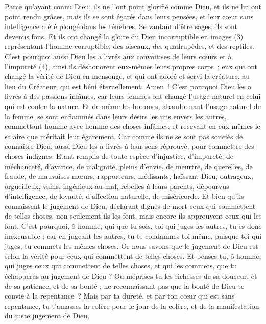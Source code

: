 \begin{multicols}{2}
Parce qu'ayant connu Dieu, ils ne l'ont point glorifié comme Dieu, et ils ne lui ont point rendu grâces, mais ils se sont égarés dans leurs pensées, et leur cœur sans intelligence a été plongé dans les ténèbres.
Se vantant d’être sages, ils sont devenus fous.
Et ils ont changé la gloire du Dieu incorruptible en images (3) représentant l'homme corruptible, des oiseaux, des quadrupèdes, et des reptiles.
C'est pourquoi aussi Dieu les a livrés aux convoitises de leurs cœurs et à l’impureté (4), ainsi ils déshonorent eux-mêmes leurs propres corps ;
eux qui ont changé la vérité de Dieu en mensonge, et qui ont adoré et servi la créature, au lieu du Créateur, qui est béni éternellement. Amen !
C'est pourquoi Dieu les a livrés à des passions infâmes, car leurs femmes ont changé l'usage naturel en celui qui est contre la nature.
Et de même les hommes, abandonnant l'usage naturel de la femme, se sont enflammés dans leurs désirs les uns envers les autres, commettant homme avec homme des choses infâmes, et recevant en eux-mêmes le salaire que méritait leur égarement.
Car comme ils ne se sont pas souciés de connaître Dieu, aussi Dieu les a livrés à leur sens réprouvé, pour commettre des choses indignes.
Etant remplis de toute espèce d’injustice, d'impureté, de méchanceté, d'avarice, de malignité, pleins d'envie, de meurtre, de querelles, de fraude, de mauvaises mœurs,
rapporteurs, médisants, haïssant Dieu, outrageux, orgueilleux, vains, ingénieux au mal, rebelles à leurs parents,
dépourvus d’intelligence, de loyauté, d’affection naturelle, de miséricorde.
Et bien qu'ils connaissent le jugement de Dieu, déclarant dignes de mort ceux qui commettent de telles choses, non seulement ils les font, mais encore ils approuvent ceux qui les font.
\VerseOne{}C'est pourquoi, ô homme, qui que tu sois, toi qui juges les autres, tu es donc inexcusable ; car en jugeant les autres, tu te condamnes toi-même, puisque toi qui juges, tu commets les mêmes choses.
Or nous savons que le jugement de Dieu est selon la vérité pour ceux qui commettent de telles choses.
Et penses-tu, ô homme, qui juges ceux qui commettent de telles choses, et qui les commets, que tu échapperas au jugement de Dieu ?
Ou méprises-tu les richesses de sa douceur, et de sa patience, et de sa bonté ; ne reconnaissant pas que la bonté de Dieu te convie à la repentance ?
Mais par ta dureté, et par ton cœur qui est sans repentance, tu t'amasses la colère pour le jour de la colère, et de la manifestation du juste jugement de Dieu,

\end{multicols}
